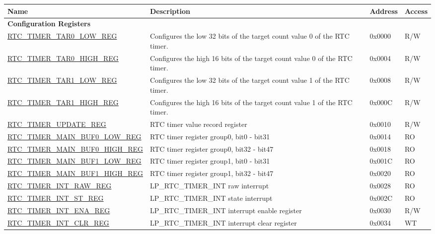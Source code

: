 \begin{longtable}{ | l | p{6cm} | p{1.3cm} | p{1.5cm} | }
\hline\rowcolor{lightgray}
\textbf{Name} & \textbf{Description} &  \textbf{Address} & \textbf{Access} \\ \hline
\endhead
\multicolumn{4}{|l|}{\textbf{Configuration Registers}} \\ \hline
\hyperref[regdesc:RTCTIMERTAR0LOWREG]{RTC\_TIMER\_TAR0\_LOW\_REG} & Configures the low 32 bits of the target count value 0 of the RTC timer. & 0x0000 & R/W \\ \hline
\hyperref[regdesc:RTCTIMERTAR0HIGHREG]{RTC\_TIMER\_TAR0\_HIGH\_REG} & Configures the high 16 bits of the target count value 0 of the RTC timer. & 0x0004 & R/W \\ \hline
\hyperref[regdesc:RTCTIMERTAR1LOWREG]{RTC\_TIMER\_TAR1\_LOW\_REG} & Configures the low 32 bits of the target count value 1 of the RTC timer. & 0x0008 & R/W \\ \hline
\hyperref[regdesc:RTCTIMERTAR1HIGHREG]{RTC\_TIMER\_TAR1\_HIGH\_REG} & Configures the high 16 bits of the target count value 1 of the RTC timer. & 0x000C & R/W \\ \hline
\hyperref[regdesc:RTCTIMERUPDATEREG]{RTC\_TIMER\_UPDATE\_REG} & RTC timer value record register  & 0x0010 & R/W \\ \hline
\hyperref[regdesc:RTCTIMERMAINBUF0LOWREG]{RTC\_TIMER\_MAIN\_BUF0\_LOW\_REG} & RTC timer register group0, bit0 - bit31 & 0x0014 & RO \\ \hline
\hyperref[regdesc:RTCTIMERMAINBUF0HIGHREG]{RTC\_TIMER\_MAIN\_BUF0\_HIGH\_REG} & RTC timer register group0, bit32 - bit47 & 0x0018 & RO \\ \hline
\hyperref[regdesc:RTCTIMERMAINBUF1LOWREG]{RTC\_TIMER\_MAIN\_BUF1\_LOW\_REG} & RTC timer register group1, bit0 - bit31 & 0x001C & RO \\ \hline
\hyperref[regdesc:RTCTIMERMAINBUF1HIGHREG]{RTC\_TIMER\_MAIN\_BUF1\_HIGH\_REG} & RTC timer register group1, bit32 - bit47  & 0x0020 & RO \\ \hline
\hyperref[regdesc:RTCTIMERINTRAWREG]{RTC\_TIMER\_INT\_RAW\_REG} & LP\_RTC\_TIMER\_INT raw interrupt  & 0x0028 & RO \\ \hline
\hyperref[regdesc:RTCTIMERINTSTREG]{RTC\_TIMER\_INT\_ST\_REG} & LP\_RTC\_TIMER\_INT state interrupt  & 0x002C & RO \\ \hline
\hyperref[regdesc:RTCTIMERINTENAREG]{RTC\_TIMER\_INT\_ENA\_REG} & LP\_RTC\_TIMER\_INT interrupt enable register & 0x0030 & R/W \\ \hline
\hyperref[regdesc:RTCTIMERINTCLRREG]{RTC\_TIMER\_INT\_CLR\_REG} & LP\_RTC\_TIMER\_INT interrupt clear register & 0x0034 & WT \\ \hline

\end{longtable}
